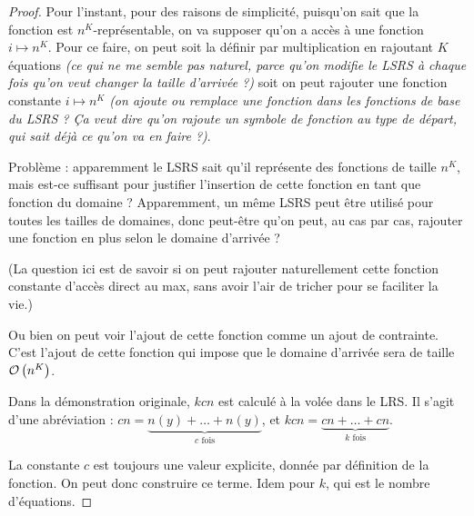 \begin{proof}
{\begin{minipage}{0.9\textwidth}
{\begin{minipage}{0.95\textwidth}
						Pour l'instant, pour des raisons de simplicité, puisqu'on sait que la fonction est $n^K$-représentable, on va supposer qu'on a accès à une fonction $i \mapsto n^K$. Pour ce faire, on peut soit la définir par multiplication en rajoutant $K$ équations \emph{(ce qui ne me semble pas naturel, parce qu'on modifie le LSRS à chaque fois qu'on veut changer la taille d'arrivée ?)} soit on peut rajouter une fonction constante $i \mapsto n^K$ \emph{(on ajoute ou remplace une fonction dans les fonctions de base du LSRS ? Ça veut dire qu'on rajoute un symbole de fonction au type de départ, qui sait déjà ce qu'on va en faire ?)}.
						
						Problème : apparemment le LSRS sait qu'il représente des fonctions de taille $n^K$, mais est-ce suffisant pour justifier l'insertion de cette fonction en tant que fonction du domaine ? Apparemment, un même LSRS peut être utilisé pour toutes les tailles de domaines, donc peut-être qu'on peut, au cas par cas, rajouter une fonction en plus selon le domaine d'arrivée ?
						
						(La question ici est de savoir si on peut rajouter naturellement cette fonction constante d'accès direct au max, sans avoir l'air de tricher pour se faciliter la vie.)
						
						Ou bien on peut voir l'ajout de cette fonction comme un ajout de contrainte. C'est l'ajout de cette fonction qui impose que le domaine d'arrivée sera de taille $\mathcal{O}\left( n^K \right)$.
					\end{minipage} }
				
					
					Dans la démonstration originale, $kcn$ est calculé à la volée dans le LRS. Il s'agit d'une abréviation : $cn = \underset{c \text{ fois}}{\underbrace{n(y) + \dots + n(y)}}$, et $kcn = \underset{k \text{ fois}}{\underbrace{cn + \dots + cn}}$. 
					
					La constante $c$ est toujours une valeur explicite, donnée par définition de la fonction. On peut donc construire ce terme. Idem pour $k$, qui est le nombre d'équations. 
					

\end{minipage}}
\end{proof}
